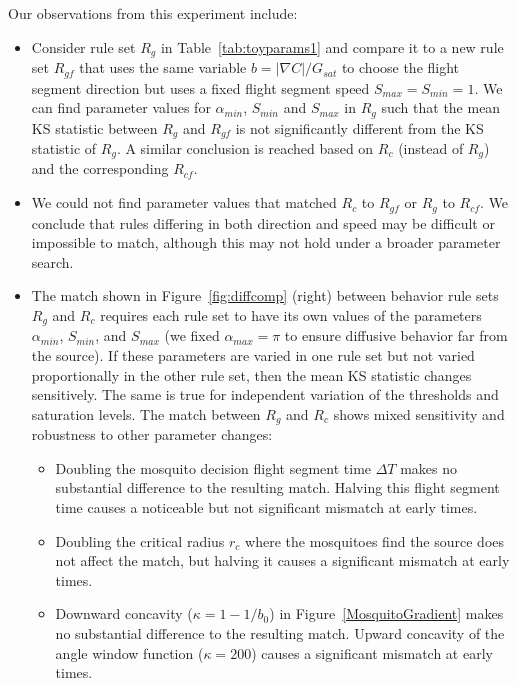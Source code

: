 \documentclass[12pt]{article}
\begin{document}
Our observations from this experiment include:
\begin{itemize}
\item
Consider rule set $R_g$ in Table~\ref{tab:toyparams1} and compare it to a new rule set $R_{gf}$  that uses
the same variable $b = |\nabla C|/G_{sat}$ to choose the flight segment direction but uses a fixed flight segment speed
$S_{max} = S_{min} = 1$.  We can find parameter values for $\alpha_{min}$, $S_{min}$ and $S_{max}$
in $R_g$ such that the mean KS statistic between $R_g$ and $R_{gf}$ is not significantly different from the KS statistic of $R_g$.
A similar conclusion is reached based on $R_c$ (instead of $R_g$) and the corresponding $R_{cf}$.

	\item
	We could not find parameter values that matched $R_c$ to $R_{gf}$ or $R_g$ to $R_{cf}$. We conclude that rules differing in both direction and speed may be difficult or impossible to match, although this may not hold under a broader parameter search.
	\item
	The match shown in Figure~\ref{fig:diffcomp} (right) between behavior rule sets $R_g$ and $R_c$ requires each rule set to have its own values of the parameters  $\alpha_{min}$, $S_{min}$, and $S_{max}$ (we fixed $\alpha_{max}=\pi$ to ensure diffusive behavior far from the source).
	 If these parameters are varied in one rule set but not varied proportionally in the other rule set, then the mean KS statistic changes sensitively. The same is true for independent variation of the thresholds and saturation levels. The match between $R_g$ and $R_c$ shows mixed sensitivity and robustness to other parameter changes:
	\begin{itemize}
		\item
		Doubling the mosquito decision flight segment time $\Delta T$ makes no substantial difference to the resulting match. Halving this flight segment time causes a noticeable but not significant mismatch at early times.
		\item
		Doubling the critical radius $r_c$ where the mosquitoes find the source does not affect the match, but halving it causes a significant mismatch at early times.
		\item
		Downward concavity ($\kappa = 1 - 1/b_0$) in Figure~\ref{MosquitoGradient} makes no substantial difference to the resulting match. Upward concavity of the angle window function ($\kappa = 200$) causes a significant mismatch at early times.
	\end{itemize}
\end{itemize}
\end{document}
